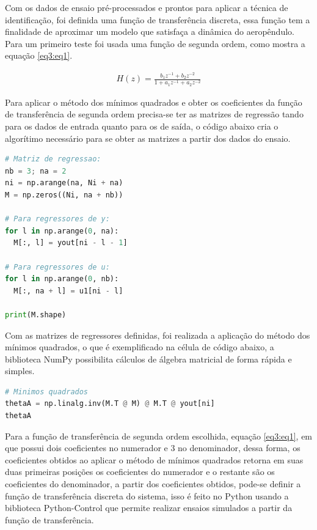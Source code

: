 Com os dados de ensaio pré-processados e prontos para aplicar a técnica de identificação, foi definida uma função de transferência discreta, essa função tem a finalidade de aproximar um modelo que satisfaça a dinâmica do aeropêndulo. Para um primeiro teste foi usada uma função de segunda ordem, como mostra a equação \ref{eq3:eq1}.

\begin{align}
    H(z) = \frac{b_1z^{-1}+b_2z^{-2}}
    {1+a_1z^{-1}+a_2z^{-2}} \label{eq3:eq1}
\end{align}

Para aplicar o método dos mínimos quadrados e obter os coeficientes da função de transferência de segunda ordem precisa-se ter as matrizes de regressão tando para os dados de entrada quanto para os de saída, o código abaixo cria o algorítimo necessário para se obter as matrizes a partir dos dados do ensaio.

\vspace{0.5cm}

\begin{lstlisting}[language=python]
# Matriz de regressao:
nb = 3; na = 2
ni = np.arange(na, Ni + na)
M = np.zeros((Ni, na + nb))

# Para regressores de y:
for l in np.arange(0, na):
  M[:, l] = yout[ni - l - 1]

# Para regressores de u:
for l in np.arange(0, nb):
  M[:, na + l] = u1[ni - l]

print(M.shape)
\end{lstlisting}

Com as matrizes de regressores definidas, foi realizada a aplicação do método dos mínimos quadrados, o que é exemplificado na célula de código abaixo, a biblioteca NumPy possibilita cálculos de álgebra matricial de forma rápida e simples.

\vspace{0.5cm}

\begin{lstlisting}[language=python]
# Minimos quadrados
thetaA = np.linalg.inv(M.T @ M) @ M.T @ yout[ni]
thetaA
\end{lstlisting}

Para a função de transferência de segunda ordem escolhida, equação \ref{eq3:eq1}, em que possui dois coeficientes no numerador e 3 no denominador, dessa forma, os coeficientes obtidos ao aplicar o método de mínimos quadrados retorna em suas duas primeiras posições os coeficientes do numerador e o restante são os coeficientes do denominador, a partir dos coeficientes obtidos, pode-se definir a função de transferência discreta do sistema, isso é feito no Python usando a biblioteca Python-Control que permite realizar ensaios simulados a partir da função de transferência.

